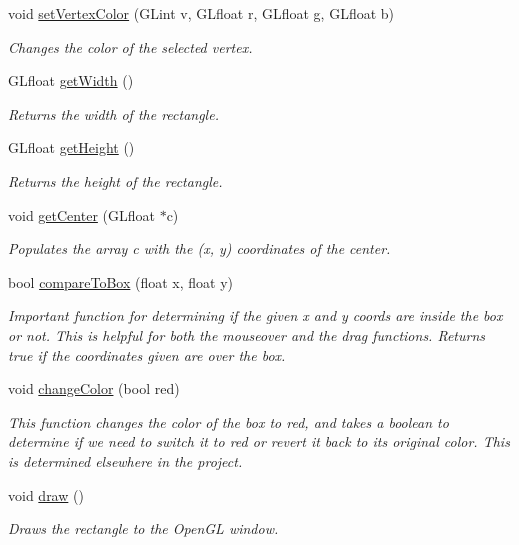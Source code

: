\begin{DoxyCompactItemize}
void \hyperlink{class_box_a909ede0f87b2cbe3f9982f8c14297032}{set\+Vertex\+Color} (G\+Lint v, G\+Lfloat r, G\+Lfloat g, G\+Lfloat b)
\begin{DoxyCompactList}\small\item\em Changes the color of the selected vertex. \end{DoxyCompactList}\item 
\mbox{\label{class_box_a02d15c0149fb43c84c831142697ebc6f}} 
G\+Lfloat \hyperlink{class_box_a02d15c0149fb43c84c831142697ebc6f}{get\+Width} ()
\begin{DoxyCompactList}\small\item\em Returns the width of the rectangle. \end{DoxyCompactList}\item 
\mbox{\label{class_box_ab4283a4e09faa73b25e32a5942377a4e}} 
G\+Lfloat \hyperlink{class_box_ab4283a4e09faa73b25e32a5942377a4e}{get\+Height} ()
\begin{DoxyCompactList}\small\item\em Returns the height of the rectangle. \end{DoxyCompactList}\item 
void \hyperlink{class_box_afe94c473ef4bb934fc6dd9a554ec4e37}{get\+Center} (G\+Lfloat $\ast$c)
\begin{DoxyCompactList}\small\item\em Populates the array c with the (x, y) coordinates of the center. \end{DoxyCompactList}\item 
bool \hyperlink{class_box_a42ae1534ed54148e5267cffe3f0862e3}{compare\+To\+Box} (float x, float y)
\begin{DoxyCompactList}\small\item\em Important function for determining if the given x and y coords are inside the box or not. This is helpful for both the mouseover and the drag functions. Returns true if the coordinates given are over the box. \end{DoxyCompactList}\item 
void \hyperlink{class_box_a2736484b950e018887a45408058bd979}{change\+Color} (bool red)
\begin{DoxyCompactList}\small\item\em This function changes the color of the box to red, and takes a boolean to determine if we need to switch it to red or revert it back to it\textquotesingle{}s original color. This is determined elsewhere in the project. \end{DoxyCompactList}\item 
\mbox{\label{class_box_a17f768f00ee22cb18146a4150f9ae396}} 
void \hyperlink{class_box_a17f768f00ee22cb18146a4150f9ae396}{draw} ()
\begin{DoxyCompactList}\small\item\em Draws the rectangle to the Open\+GL window. \end{DoxyCompactList}\end{DoxyCompactItemize}
